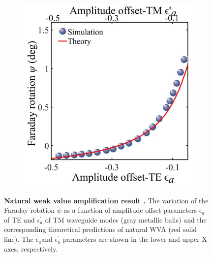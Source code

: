 \documentclass[13pt]{article}
\begin{document}
	
	\begin{figure}[hbt!]
		\centering
		\begin{subfigure}[]{.49\linewidth}
			\centering
			\includegraphics[width=\linewidth]{Figures/figure3a.png}
		\end{subfigure}
		\caption{\textbf{Natural weak value amplification result .} The variation of the Faraday rotation $\psi$ as a function of amplitude offset parameters $\epsilon_a$ of TE and $\epsilon^{'}_a$ of TM waveguide modes (gray metallic balls) and the corresponding theoretical predictions of natural WVA (red solid line). The $\epsilon_a$and $\epsilon^{'}_a$ parameters are shown in the lower and upper X-axes, respectively. }
		\label{fig:figure3}
	\end{figure}
\end{document}
